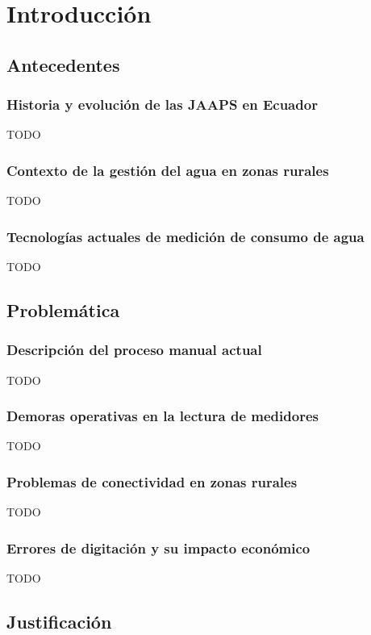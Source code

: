 \chapter{Introducción}

\section{Antecedentes}

\subsection{Historia y evolución de las JAAPS en Ecuador}
TODO

\subsection{Contexto de la gestión del agua en zonas rurales}
TODO

\subsection{Tecnologías actuales de medición de consumo de agua}
TODO

\section{Problemática}

\subsection{Descripción del proceso manual actual}
TODO

\subsection{Demoras operativas en la lectura de medidores}
TODO

\subsection{Problemas de conectividad en zonas rurales}
TODO

\subsection{Errores de digitación y su impacto económico}
TODO

\section{Justificación}

